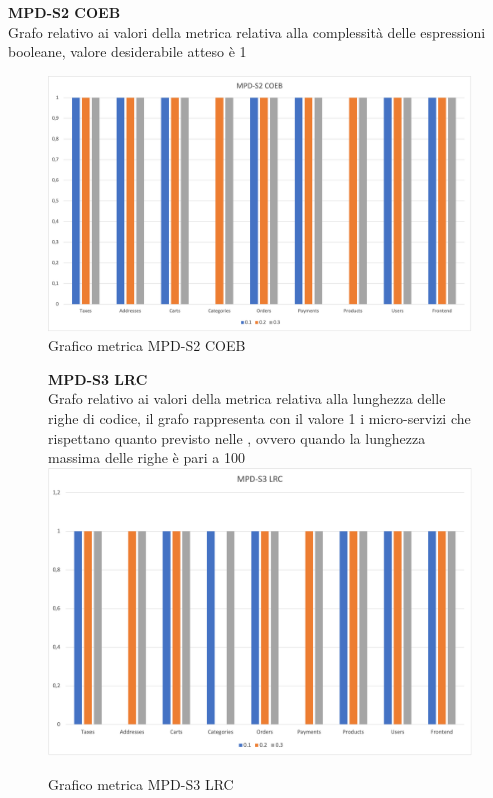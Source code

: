 \begin{center}
    \textbf{MPD-S2 COEB} \\
    Grafo relativo ai valori della metrica relativa alla complessità delle espressioni booleane, valore desiderabile atteso è 1
    \begin{figure}[!htb]
        \centering
        \includegraphics[scale=0.50]{res/images/RQcoeb.png}
        \caption{Grafico metrica MPD-S2 COEB}
    \end{figure}
    \begin{center}
        
    \end{center}

    \begin{figure}[!htb]
        \centering
        \textbf{MPD-S3 LRC} \\
        Grafo relativo ai valori della metrica relativa alla lunghezza delle righe di codice, il grafo rappresenta con il valore 1 i micro-servizi
        che rispettano quanto previsto nelle , ovvero quando la lunghezza massima delle righe è pari a 100 
        \includegraphics[scale=0.50]{res/images/RQlrc.png}
        \caption{Grafico metrica MPD-S3 LRC}
    \end{figure}
    \begin{center}
        

\end{center}
\end{center}
